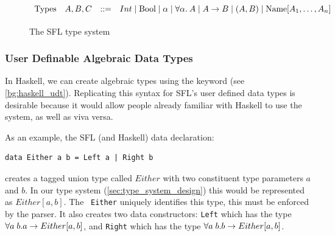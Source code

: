 \begin{figure}
    \[
        \begin{array}{llcl}
            \text{Types} & A, B, C & \mathrel{::=} &
                Int \mathrel{\mid} 
                \text{Bool} \mathrel{\mid} 
                \alpha \mathrel{\mid} \forall\alpha.\:{A} \mathrel{\mid} 
                A \rightarrow B \mathrel{\mid} (A, B) \mathrel{\mid} \text{Name}[A_1, \dots, A_n]
            \\[2pt]
        \end{array}
    \]
    \caption{The SFL type system}
    \label{fig:sfl_types_no_exst}
\end{figure}

\subsubsection{User Definable Algebraic Data Types}
\label{c2:design_data_types}
In Haskell, we can create algebraic types using the  keyword (see \ref{bg:haskell_udt}). Replicating this syntax for \ac{SFL}'s user defined data types is desirable because it would allow people already familiar with Haskell to use the system, as well as viva versa. 

As an example, the SFL (and Haskell) data declaration:
\begin{lstlisting}[language=SFL_unboxed_noprelude]
data Either a b = Left a | Right b
\end{lstlisting}
\noindent creates a tagged union type called $Either$ with two constituent type parameters $a$ and $b$. In our type system (\ref{sec:type_system_design}) this would be represented as $Either[a, b]$. The \Unionname 
 \ \verb|Either| uniquely identifies this type, this must be enforced by the parser. It also creates two data constructors: \verb|Left| which has the type $\forall a\;b. a \rightarrow Either[a,b]$, and \verb|Right| which has the type $\forall a\;b. b \rightarrow Either[a,b]$. 

